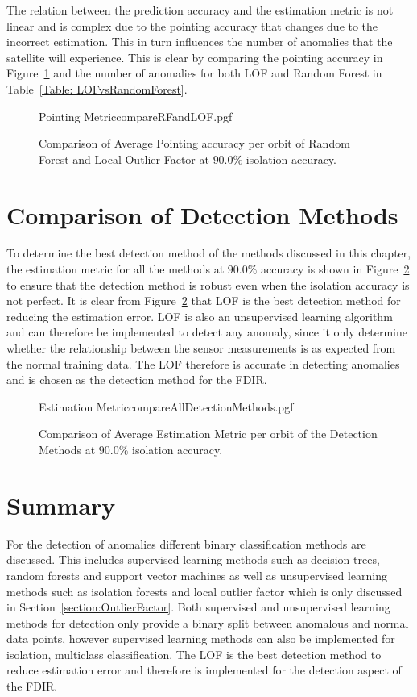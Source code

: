 The relation between the prediction accuracy and the estimation metric is not linear and is complex due to the pointing accuracy that changes due to the incorrect estimation. This in turn influences the number of anomalies that the satellite will experience. This is clear by comparing the pointing accuracy in Figure~\ref{fig:LOFvsRF} and the number of anomalies for both LOF and Random Forest in Table~\ref{Table: LOFvsRandomForest}.

\begin{figure}[!htb]
	\centering
	{Pointing MetriccompareRFandLOF.pgf}
	
	\caption{Comparison of Average Pointing accuracy per orbit of Random Forest and Local Outlier Factor at $90.0\%$ isolation accuracy.}
	\label{fig:LOFvsRF}
\end{figure}

\section{Comparison of Detection Methods}
To determine the best detection method of the methods discussed in this chapter, the estimation metric for all the methods at $90.0\%$ accuracy is shown in Figure~\ref{fig:DetectionMethodsWithPerfectIsolation} to ensure that the detection method is robust even when the isolation accuracy is not perfect. It is clear from Figure~\ref{fig:DetectionMethodsWithPerfectIsolation} that LOF is the best detection method for reducing the estimation error. LOF is also an unsupervised learning algorithm and can therefore be implemented to detect any anomaly, since it only determine whether the relationship between the sensor measurements is as expected from the normal training data. The LOF therefore is accurate in detecting anomalies and is chosen as the detection method for the FDIR.

\begin{figure}[!htb]
	\centering
	{Estimation MetriccompareAllDetectionMethods.pgf}
	
	\caption{Comparison of Average Estimation Metric per orbit of the Detection Methods at $90.0\%$ isolation accuracy.}
	\label{fig:DetectionMethodsWithPerfectIsolation}
\end{figure}


\section{Summary}
For the detection of anomalies different binary classification methods are discussed. This includes supervised learning methods such as decision trees, random forests and support vector machines as well as unsupervised learning methods such as isolation forests and local outlier factor which is only discussed in Section~\ref{section:OutlierFactor}. Both supervised and unsupervised learning methods for detection only provide a binary split between anomalous and normal data points, however supervised learning methods can also be implemented for isolation, multiclass classification. The LOF is the best detection method to reduce estimation error and therefore is implemented for the detection aspect of the FDIR.